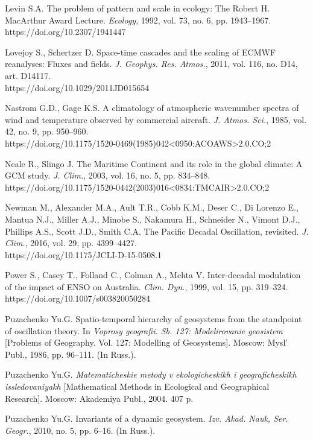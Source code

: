 \documentclass[12pt,a4paper]{article}
\begin{document}
\noindent Levin S.A. The problem of pattern and scale in ecology: The Robert H. MacArthur Award Lecture. \textit{Ecology}, 1992, vol. 73, no. 6, pp. 1943–1967.\\ https://doi.org/10.2307/1941447

\noindent Lovejoy S., Schertzer D. Space-time cascades and the scaling of ECMWF reanalyses: Fluxes and fields. \textit{J. Geophys. Res. Atmos.}, 2011, vol. 116, no. D14, art. D14117.\\ https://doi.org/10.1029/2011JD015654

\noindent Nastrom G.D., Gage K.S. A climatology of atmospheric wavenumber spectra of wind and temperature observed by commercial aircraft. \textit{J. Atmos. Sci.}, 1985, vol. 42, no. 9, pp. 950–960.\\ https://doi.org/10.1175/1520-0469(1985)042<0950:ACOAWS>2.0.CO;2

\noindent Neale R., Slingo J. The Maritime Continent and its role in the global climate: A GCM study. \textit{J. Clim.}, 2003, vol. 16, no. 5, pp. 834–848.\\ https://doi.org/10.1175/1520-0442(2003)016<0834:TMCAIR>2.0.CO;2

\noindent Newman M., Alexander M.A., Ault T.R., Cobb K.M., Deser C., Di Lorenzo E., Mantua N.J., Miller A.J., Minobe S., Nakamura H., Schneider N., Vimont D.J., Phillips A.S., Scott J.D., Smith C.A. The Pacific Decadal Oscillation, revisited. \textit{J. Clim.}, 2016, vol. 29, pp. 4399–4427.\\ https://doi.org/10.1175/JCLI-D-15-0508.1

\noindent Power S., Casey T., Folland C., Colman A., Mehta V. Inter-decadal modulation of the impact of ENSO on Australia. \textit{Clim. Dyn.}, 1999, vol. 15, pp. 319–324.\\ https://doi.org/10.1007/s003820050284

\noindent Puzachenko Yu.G. Spatio-temporal hierarchy of geosystems from the standpoint of oscillation theory. In \textit{Voprosy geografii. Sb. 127: Modelirovanie geosistem} [Problems of Geography. Vol. 127: Modelling of Geosystems]. Moscow: Mysl’ Publ., 1986, pp. 96–111. (In Russ.).

\noindent Puzachenko Yu.G. \textit{Matematicheskie metody v ekologicheskikh i geograficheskikh issledovaniyakh} [Mathematical Methods in Ecological and Geographical Research]. Moscow: Akademiya Publ., 2004. 407 p.

\noindent Puzachenko Yu.G. Invariants of a dynamic geosystem. \textit{Izv. Akad. Nauk, Ser. Geogr.}, 2010, no. 5, pp. 6–16. (In Russ.).
\end{document}
